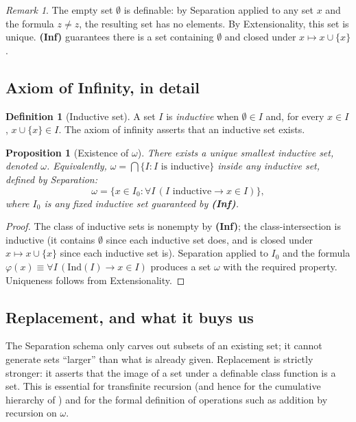 \documentclass[12pt]{article}
\newtheorem{proposition}[theorem]{Proposition}
\theoremstyle{definition}
\newtheorem{definition}[theorem]{Definition}
\theoremstyle{remark}
\newtheorem{remark}[theorem]{Remark}
\begin{document}
\begin{remark}
The empty set $\emptyset$ is definable: by Separation applied to any set $x$
and the formula $z \neq z$, the resulting set has no elements. By Extensionality,
this set is unique. \textbf{(Inf)} guarantees there is a set containing $\emptyset$
and closed under $x \mapsto x \cup \{x\}$.
\end{remark}

\subsection{Axiom of Infinity, in detail}

\begin{definition}[Inductive set]
A set $I$ is \emph{inductive} when $\emptyset \in I$ and, for every $x \in I$,
$x \cup \{x\} \in I$. The axiom of infinity asserts that an inductive set exists.
\end{definition}

\begin{proposition}[Existence of $\omega$]\label{prop:omega}
There exists a unique smallest inductive set, denoted $\omega$. Equivalently,
$\omega = \bigcap \{I : I \text{ is inductive}\}$ inside any inductive set,
defined by Separation:
\begin{equation}
\omega = \{x \in I_0 : \forall I\,(I \text{ inductive} \to x \in I)\},
\end{equation}
where $I_0$ is any fixed inductive set guaranteed by \textbf{(Inf)}.
\end{proposition}

\begin{proof}
The class of inductive sets is nonempty by \textbf{(Inf)}; the
class-intersection is inductive (it contains $\emptyset$ since each inductive
set does, and is closed under $x \mapsto x \cup \{x\}$ since each inductive
set is). Separation applied to $I_0$ and the formula
$\varphi(x) \equiv \forall I\,(\text{Ind}(I) \to x \in I)$ produces a set $\omega$
with the required property. Uniqueness follows from Extensionality.
\end{proof}

\subsection{Replacement, and what it buys us}

The Separation schema only carves out subsets of an existing set; it cannot
generate sets ``larger'' than what is already given. Replacement is strictly
stronger: it asserts that the image of a set under a definable class function
is a set. This is essential for transfinite recursion (and hence for the
cumulative hierarchy of ) and for the formal definition
of operations such as addition by recursion on $\omega$.
\end{document}
